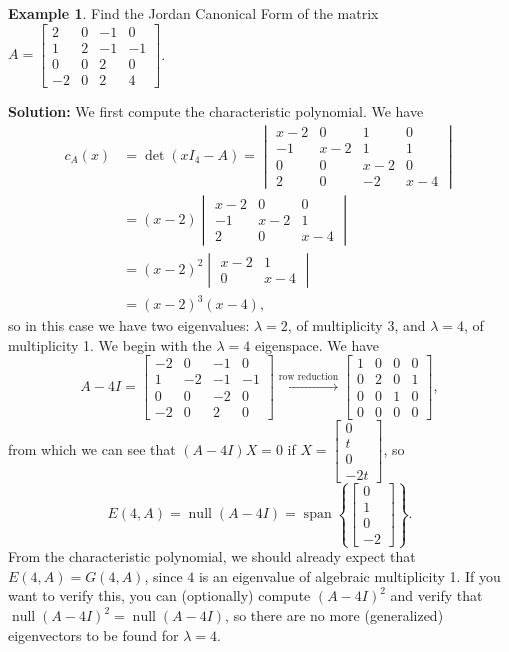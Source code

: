 \documentclass[12pt,letterpaper]{article}
\theoremstyle{definition}
\newtheorem{example}{Example}
\DeclareMathOperator{\spn}{span}
\DeclareMathOperator{\nul}{null}
\begin{document}
\begin{example}
 Find the Jordan Canonical Form of the matrix 
$A = \begin{bmatrix}
      2&0&-1&0\\1&2&-1&-1\\0&0&2&0\\-2&0&2&4
     \end{bmatrix}$.

\bigskip

{\bf Solution:} We first compute the characteristic polynomial. We have
\begin{align*}
 c_A(x) & = \det(xI_4-A) = \begin{vmatrix}x-2&0&1&0\\-1&x-2&1&1\\0&0&x-2&0\\2&0&-2&x-4\end{vmatrix}\\
&=(x-2)\begin{vmatrix}x-2&0&0\\-1&x-2&1\\2&0&x-4\end{vmatrix}\\
&=(x-2)^2\begin{vmatrix}x-2&1\\0&x-4\end{vmatrix}\\
&=(x-2)^3(x-4),
\end{align*}
so in this case we have two eigenvalues: $\lambda=2$, of multiplicity 3, and $\lambda=4$, of multiplicity 1. We begin with the $\lambda=4$ eigenspace. We have
\[
 A-4I = \begin{bmatrix}
         -2&0&-1&0\\1&-2&-1&-1\\0&0&-2&0\\-2&0&2&0
        \end{bmatrix}\xrightarrow[]{\text{row reduction}}
\begin{bmatrix}
 1&0&0&0\\0&2&0&1\\0&0&1&0\\0&0&0&0
\end{bmatrix},
\]
from which we can see that $(A-4I)X=0$ if $X=\begin{bmatrix}0\\t\\0\\-2t\end{bmatrix}$, so
\[
 E(4,A)=\nul(A-4I) = \spn\left\{\begin{bmatrix}0\\1\\0\\-2\end{bmatrix}\right\}.
\]
From the characteristic polynomial, we should already expect that $E(4,A)=G(4,A)$, since $4$ is an eigenvalue of algebraic multiplicity 1. If you want to verify this, you can (optionally) compute $(A-4I)^2$ and verify that $\nul (A-4I)^2=\nul(A-4I)$, so there are no more (generalized) eigenvectors to be found for $\lambda =4$.


\end{example}
\end{document}
